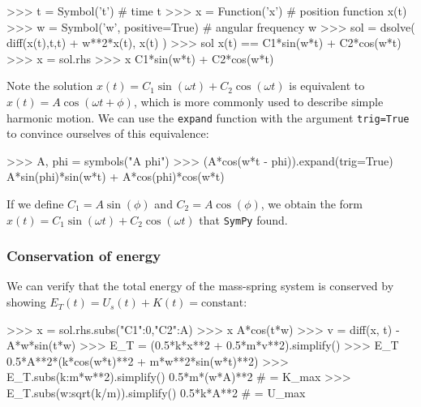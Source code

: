 \small
\begin{verbatimtab}
>>> t = Symbol('t')                   # time            t
>>> x = Function('x')                 # position function x(t)
>>> w = Symbol('w', positive=True)    # angular frequency w
>>> sol = dsolve( diff(x(t),t,t) + w**2*x(t), x(t) )
>>> sol
x(t) == C1*sin(w*t) + C2*cos(w*t)  
>>> x = sol.rhs           
>>> x 
C1*sin(w*t) + C2*cos(w*t)
\end{verbatimtab}
\normalsize

\noindent
Note the solution $x(t)=C_1\sin(\omega t)+C_2 \cos(\omega t)$ is equivalent to $x(t) = A\cos(\omega t + \phi)$, 
which is more commonly used to describe simple harmonic motion. 
We can use the \texttt{expand} function with the argument \texttt{trig=True} to convince ourselves of this equivalence:

\small
\begin{verbatimtab}
>>> A, phi = symbols("A phi")
>>> (A*cos(w*t - phi)).expand(trig=True)
A*sin(phi)*sin(w*t) + A*cos(phi)*cos(w*t)
\end{verbatimtab}
\normalsize

\noindent
If we define $C_1=A\sin(\phi)$ and $C_2=A\cos(\phi)$, 
we obtain the form $x(t)=C_1\sin(\omega t)+C_2 \cos(\omega t)$ that \texttt{SymPy} found.


\subsubsection{Conservation of energy}

We can verify that the total energy of the mass-spring system is conserved by showing 
$E_T(t) = U_s(t) + K(t) = \textrm{constant}$: 

\small
\begin{verbatimtab}
>>> x = sol.rhs.subs({"C1":0,"C2":A}) 
>>> x
A*cos(t*w)
>>> v = diff(x, t)
-A*w*sin(t*w)
>>> E_T = (0.5*k*x**2 + 0.5*m*v**2).simplify()
>>> E_T
0.5*A**2*(k*cos(w*t)**2 + m*w**2*sin(w*t)**2)
>>> E_T.subs({k:m*w**2}).simplify()
0.5*m*(w*A)**2                            # = K_max
>>> E_T.subs({w:sqrt(k/m)}).simplify()
0.5*k*A**2                                # = U_max 
\end{verbatimtab}
\normalsize



